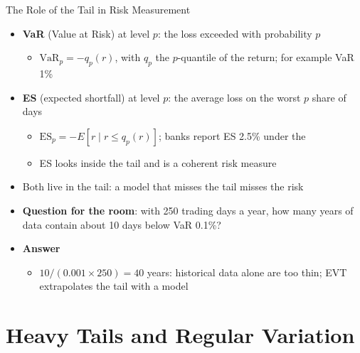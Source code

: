 \begin{frame}{The Role of the Tail in Risk Measurement}
\itemsize{\small}
\begin{itemize}
    \item \textbf{VaR} (Value at Risk) at level $p$: the loss exceeded with probability $p$
    \begin{itemize}
        \item $\mathrm{VaR}_p = -q_p(r)$, with $q_p$ the $p$-quantile of the return; for example VaR 1\%
    \end{itemize}
    \item \textbf{ES} (expected shortfall) at level $p$: the average loss on the worst $p$ share of days
    \begin{itemize}
        \item $\mathrm{ES}_p = -E[r \mid r \le q_p(r)]$; banks report ES 2.5\% under the 
        \item ES looks inside the tail and is a coherent risk measure 
    \end{itemize}
    \item Both live in the tail: a model that misses the tail misses the risk
    \item \textbf{Question for the room}: with 250 trading days a year, how many years of data contain about 10 days below VaR 0.1\%?
    \item \textbf{Answer}
    \begin{itemize}
        \item $10 / (0.001 \times 250) = 40$ years: historical data alone are too thin; EVT extrapolates the tail with a model
    \end{itemize}
\end{itemize}
\end{frame}


\section{Heavy Tails and Regular Variation}

